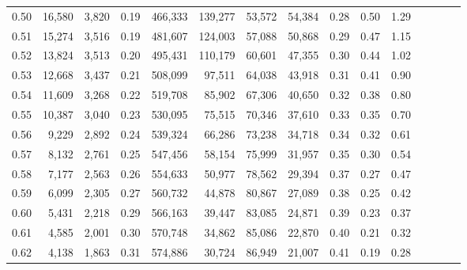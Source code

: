 \begin{tabular}{rrrcrrrrrrrrrrr}
0.50 &  16,580 &  3,820 &                                       0.19 &  466,333 &  139,277 &   53,572 &   54,384 &  0.28 &  0.50 &                         1.29 \\
0.51 &  15,274 &  3,516 &                                       0.19 &  481,607 &  124,003 &   57,088 &   50,868 &  0.29 &  0.47 &                         1.15 \\
0.52 &  13,824 &  3,513 &                                       0.20 &  495,431 &  110,179 &   60,601 &   47,355 &  0.30 &  0.44 &                         1.02 \\
0.53 &  12,668 &  3,437 &                                       0.21 &  508,099 &   97,511 &   64,038 &   43,918 &  0.31 &  0.41 &                         0.90 \\
0.54 &  11,609 &  3,268 &                                       0.22 &  519,708 &   85,902 &   67,306 &   40,650 &  0.32 &  0.38 &                         0.80 \\
0.55 &  10,387 &  3,040 &                                       0.23 &  530,095 &   75,515 &   70,346 &   37,610 &  0.33 &  0.35 &                         0.70 \\
0.56 &   9,229 &  2,892 &                                       0.24 &  539,324 &   66,286 &   73,238 &   34,718 &  0.34 &  0.32 &                         0.61 \\
0.57 &   8,132 &  2,761 &                                       0.25 &  547,456 &   58,154 &   75,999 &   31,957 &  0.35 &  0.30 &                         0.54 \\
0.58 &   7,177 &  2,563 &                                       0.26 &  554,633 &   50,977 &   78,562 &   29,394 &  0.37 &  0.27 &                         0.47 \\
0.59 &   6,099 &  2,305 &                                       0.27 &  560,732 &   44,878 &   80,867 &   27,089 &  0.38 &  0.25 &                         0.42 \\
0.60 &   5,431 &  2,218 &                                       0.29 &  566,163 &   39,447 &   83,085 &   24,871 &  0.39 &  0.23 &                         0.37 \\
0.61 &   4,585 &  2,001 &                                       0.30 &  570,748 &   34,862 &   85,086 &   22,870 &  0.40 &  0.21 &                         0.32 \\
0.62 &   4,138 &  1,863 &                                       0.31 &  574,886 &   30,724 &   86,949 &   21,007 &  0.41 &  0.19 &                         0.28 \\

\end{tabular}
